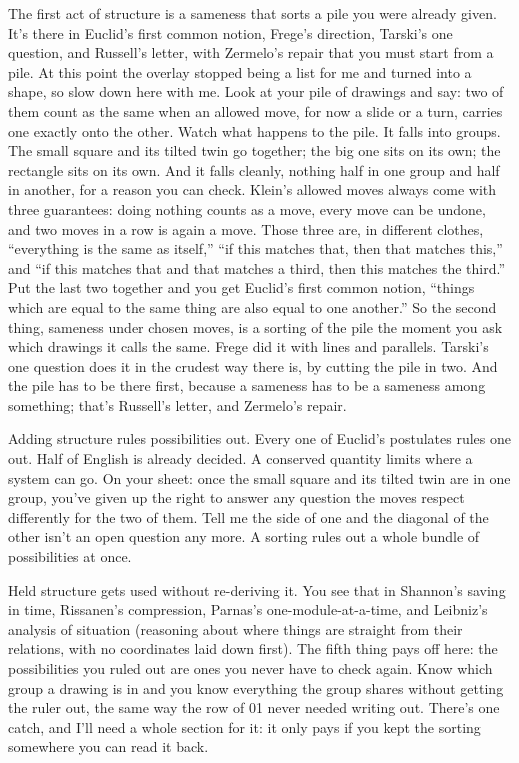 \documentclass[11pt,twoside]{article}
\theoremstyle{thielethm}
\theoremstyle{thieledef}
\theoremstyle{thieledef}
\theoremstyle{thieledef}
\theoremstyle{thielethm}
\theoremstyle{thieleobs}
\theoremstyle{thielethm}
\begin{document}
The first act of structure is a sameness that sorts a pile you were already given. It's there in Euclid's first common notion, Frege's direction, Tarski's one question, and Russell's letter, with Zermelo's repair that you must start from a pile. At this point the overlay stopped being a list for me and turned into a shape, so slow down here with me. Look at your pile of drawings and say: two of them count as the same when an allowed move, for now a slide or a turn, carries one exactly onto the other. Watch what happens to the pile. It falls into groups. The small square and its tilted twin go together; the big one sits on its own; the rectangle sits on its own. And it falls cleanly, nothing half in one group and half in another, for a reason you can check. Klein's allowed moves always come with three guarantees: doing nothing counts as a move, every move can be undone, and two moves in a row is again a move. Those three are, in different clothes, ``everything is the same as itself,'' ``if this matches that, then that matches this,'' and ``if this matches that and that matches a third, then this matches the third.'' Put the last two together and you get Euclid's first common notion, ``things which are equal to the same thing are also equal to one another.'' So the second thing, sameness under chosen moves, is a sorting of the pile the moment you ask which drawings it calls the same. Frege did it with lines and parallels. Tarski's one question does it in the crudest way there is, by cutting the pile in two. And the pile has to be there first, because a sameness has to be a sameness among something; that's Russell's letter, and Zermelo's repair.

Adding structure rules possibilities out. Every one of Euclid's postulates rules one out. Half of English is already decided. A conserved quantity limits where a system can go. On your sheet: once the small square and its tilted twin are in one group, you've given up the right to answer any question the moves respect differently for the two of them. Tell me the side of one and the diagonal of the other isn't an open question any more. A sorting rules out a whole bundle of possibilities at once.

Held structure gets used without re-deriving it. You see that in Shannon's saving in time, Rissanen's compression, Parnas's one-module-at-a-time, and Leibniz's analysis of situation (reasoning about where things are straight from their relations, with no coordinates laid down first). The fifth thing pays off here: the possibilities you ruled out are ones you never have to check again. Know which group a drawing is in and you know everything the group shares without getting the ruler out, the same way the row of 01 never needed writing out. There's one catch, and I'll need a whole section for it: it only pays if you kept the sorting somewhere you can read it back.
\end{document}

